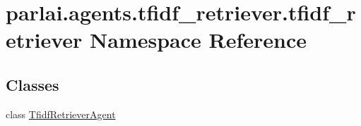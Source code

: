 \hypertarget{namespaceparlai_1_1agents_1_1tfidf__retriever_1_1tfidf__retriever}{}\section{parlai.\+agents.\+tfidf\+\_\+retriever.\+tfidf\+\_\+retriever Namespace Reference}
\label{namespaceparlai_1_1agents_1_1tfidf__retriever_1_1tfidf__retriever}
\subsection*{Classes}
\begin{DoxyCompactItemize}
\item 
class \hyperlink{classparlai_1_1agents_1_1tfidf__retriever_1_1tfidf__retriever_1_1TfidfRetrieverAgent}{Tfidf\+Retriever\+Agent}
\end{DoxyCompactItemize}
